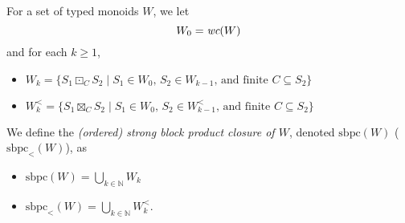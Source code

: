 \documentclass[a4paper,UKenglish,cleveref, autoref, thm-restate, anonymous]{lipics-v2021}
\begin{document}
\begin{definition}
    For a set of typed monoids $W$, we let \[
        W_0 = \emph{wc}(W)
    \] and for each $k \geq 1$,
    \begin{itemize}
        \item $W_k = \{S_1 \boxdot_C S_2 \mid S_1 \in W_0 \text{, } S_2 \in W_{k-1} \text{, and finite } C \subseteq S_2\}$
        \item $W_k^< = \{S_1 \boxtimes_C S_2 \mid S_1 \in W_0 \text{, } S_2 \in W_{k-1}^< \text{, and finite } C \subseteq S_2\}$
    \end{itemize}
    We define the \emph{(ordered) strong block product closure of $W$}, denoted $\text{sbpc}(W)$ ($\text{sbpc}_<(W)$), as
    \begin{itemize}
        \item $\text{sbpc}(W) = \bigcup_{k \in \mathbb{N}} W_k$
        \item $\text{sbpc}_<(W) = \bigcup_{k \in \mathbb{N}} W_k^<$.
    \end{itemize}
\end{definition}
\end{document}
